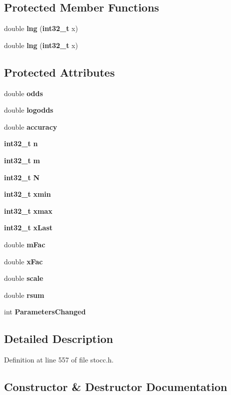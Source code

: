 \subsection*{Protected Member Functions}
\begin{DoxyCompactItemize}
\item 
double {\bf lng} ({\bf int32\-\_\-t} x)
\item 
double {\bf lng} ({\bf int32\-\_\-t} x)
\end{DoxyCompactItemize}
\subsection*{Protected Attributes}
\begin{DoxyCompactItemize}
\item 
double {\bf odds}
\item 
double {\bf logodds}
\item 
double {\bf accuracy}
\item 
{\bf int32\-\_\-t} {\bf n}
\item 
{\bf int32\-\_\-t} {\bf m}
\item 
{\bf int32\-\_\-t} {\bf N}
\item 
{\bf int32\-\_\-t} {\bf xmin}
\item 
{\bf int32\-\_\-t} {\bf xmax}
\item 
{\bf int32\-\_\-t} {\bf x\-Last}
\item 
double {\bf m\-Fac}
\item 
double {\bf x\-Fac}
\item 
double {\bf scale}
\item 
double {\bf rsum}
\item 
int {\bf Parameters\-Changed}
\end{DoxyCompactItemize}


\subsection{Detailed Description}


Definition at line 557 of file stocc.\-h.



\subsection{Constructor \& Destructor Documentation}
